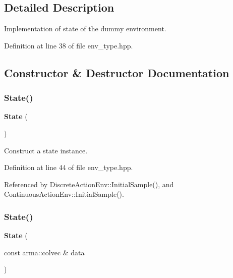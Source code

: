 \subsection{Detailed Description}
Implementation of state of the dummy environment. 

Definition at line 38 of file env\+\_\+type.\+hpp.



\subsection{Constructor \& Destructor Documentation}
\mbox{\label{classmlpack_1_1rl_1_1DiscreteActionEnv_1_1State_a790355057d12e9c1ce7643551c16fecd}} 
\subsubsection{State()\hspace{0.1cm}{\footnotesize\ttfamily [1/2]}}
{\footnotesize\ttfamily \textbf{ State} (\begin{DoxyParamCaption}{ }\end{DoxyParamCaption})\hspace{0.3cm}{\ttfamily [inline]}}



Construct a state instance. 



Definition at line 44 of file env\+\_\+type.\+hpp.



Referenced by Discrete\+Action\+Env\+::\+Initial\+Sample(), and Continuous\+Action\+Env\+::\+Initial\+Sample().

\mbox{\label{classmlpack_1_1rl_1_1DiscreteActionEnv_1_1State_a8bc7967f6d91a3c94f9b3f502297a926}} 
\subsubsection{State()\hspace{0.1cm}{\footnotesize\ttfamily [2/2]}}
{\footnotesize\ttfamily \textbf{ State} (\begin{DoxyParamCaption}\item[{const arma\+::colvec \&}]{data }\end{DoxyParamCaption})\hspace{0.3cm}{\ttfamily [inline]}}



